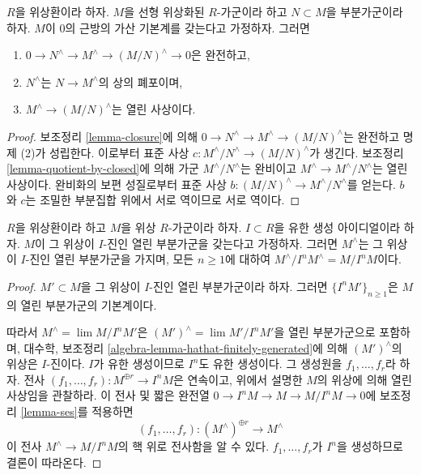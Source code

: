\begin{lemma}
\label{lemma-ses}
\begin{reference}
\cite[Theorem 8.1]{Ma}
\end{reference}
$R$을 위상환이라 하자. $M$을 선형 위상화된 $R$-가군이라 하고
$N \subset M$을 부분가군이라 하자. $M$이 $0$의 근방의 가산
기본계를 갖는다고 가정하자. 그러면
\begin{enumerate}
\item $0 \to N^\wedge \to M^\wedge \to (M/N)^\wedge \to 0$은 완전하고,
\item $N^\wedge$는 $N \to M^\wedge$의 상의 폐포이며,
\item $M^\wedge \to (M/N)^\wedge$는 열린 사상이다.
\end{enumerate}
\end{lemma}

\begin{proof}
보조정리 \ref{lemma-closure}에 의해
$0 \to N^\wedge \to M^\wedge \to (M/N)^\wedge$는 완전하고
명제 (2)가 성립한다. 이로부터 표준 사상
$c : M^\wedge/N^\wedge \to (M/N)^\wedge$가 생긴다.
보조정리 \ref{lemma-quotient-by-closed}에 의해 가군
$M^\wedge/N^\wedge$는 완비이고
$M^\wedge \to M^\wedge/N^\wedge$는 열린 사상이다.
완비화의 보편 성질로부터 표준 사상
$b : (M/N)^\wedge \to M^\wedge/N^\wedge$를 얻는다.
$b$와 $c$는 조밀한 부분집합 위에서 서로 역이므로 서로 역이다.
\end{proof}

\begin{lemma}
\label{lemma-completion-adic-star}
$R$을 위상환이라 하고 $M$을 위상 $R$-가군이라 하자.
$I \subset R$을 유한 생성 아이디얼이라 하자. $M$이 그 위상이
$I$-진인 열린 부분가군을 갖는다고 가정하자. 그러면 $M^\wedge$는
그 위상이 $I$-진인 열린 부분가군을 가지며, 모든 $n \geq 1$에 대하여
$M^\wedge/I^n M^\wedge = M/I^nM$이다.
\end{lemma}

\begin{proof}
$M' \subset M$을 그 위상이 $I$-진인 열린 부분가군이라 하자.
그러면 $\{I^nM'\}_{n \geq 1}$은 $M$의 열린 부분가군의 기본계이다.
\par\noindent
따라서 $M^\wedge = \lim M/I^nM'$은
$(M')^\wedge = \lim M'/I^nM'$을 열린 부분가군으로 포함하며,
대수학, 보조정리 \ref{algebra-lemma-hathat-finitely-generated}에 의해
$(M')^\wedge$의 위상은 $I$-진이다. $I$가 유한 생성이므로 $I^n$도
유한 생성이다. 그 생성원을 $f_1, \ldots, f_r$라 하자. 전사
$(f_1, \ldots, f_r) : M^{\oplus r} \to I^n M$은 연속이고,
위에서 설명한 $M$의 위상에 의해 열린 사상임을 관찰하라.
이 전사 및 짧은 완전열
$0 \to I^nM \to M \to M/I^nM \to 0$에 보조정리
\ref{lemma-ses}를 적용하면
$$
(f_1, \ldots, f_r) :
(M^\wedge)^{\oplus r} \longrightarrow M^\wedge
$$
이 전사 $M^\wedge \to M/I^nM$의 핵 위로 전사함을 알 수 있다.
$f_1, \ldots, f_r$가 $I^n$을 생성하므로 결론이 따라온다.
\end{proof}

